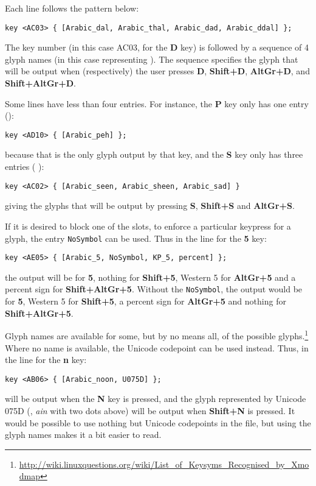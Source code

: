 Each line follows the pattern below:

\verb|key <AC03> { [Arabic_dal, Arabic_thal, Arabic_dad, Arabic_ddal] };|

The key number (in this case AC03, for the \textbf{D} key) is followed by a sequence of 4 glyph names (in this case representing ).  The sequence specifies the glyph that will be output when (respectively) the user presses \textbf{D}, \textbf{Shift+D}, \textbf{AltGr+D}, and \textbf{Shift+AltGr+D}.

Some lines have less than four entries.  For instance, the \textbf{P} key only has one entry ():

\verb|key <AD10> { [Arabic_peh] };|

because that is the only glyph output by that key, and the \textbf{S} key only has three entries ( ):

\verb|key <AC02> { [Arabic_seen, Arabic_sheen, Arabic_sad] }|

giving the glyphs that will be output by pressing \textbf{S}, \textbf{Shift+S} and \textbf{AltGr+S}.

If it is desired to block one of the slots, to enforce a particular keypress for a glyph, the entry \verb|NoSymbol| can be used.  Thus in the line for the \textbf{5} key:

\verb|key <AE05> { [Arabic_5, NoSymbol, KP_5, percent] };|

the output will be  for \textbf{5}, nothing for \textbf{Shift+5}, Western 5 for \textbf{AltGr+5} and a percent sign for \textbf{Shift+AltGr+5}.  Without the \verb|NoSymbol|, the output would be  for \textbf{5}, Western 5 for \textbf{Shift+5}, a percent sign for \textbf{AltGr+5} and nothing for \textbf{Shift+AltGr+5}.

Glyph names are available for some, but by no means all, of the possible glyphs.\footnote{\url{http://wiki.linuxquestions.org/wiki/List_of_Keysyms_Recognised_by_Xmodmap}}  Where no name is available, the Unicode codepoint can be used instead.  Thus, in the line for the \textbf{n} key:

\verb|key <AB06> { [Arabic_noon, U075D] };|

 will be output when the \textbf{N} key is pressed, and the glyph represented by Unicode 075D (, \textit{ain} with two dots above) will be output when \textbf{Shift+N} is pressed.  It would be possible to use nothing but Unicode codepoints in the file, but using the glyph names makes it a bit easier to read.

